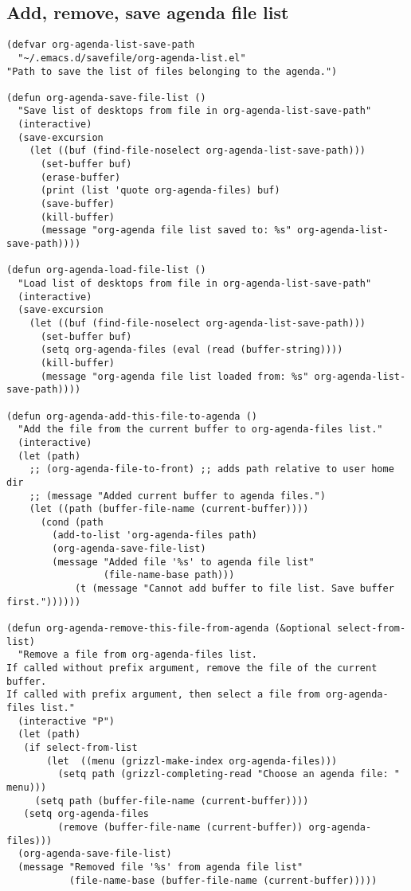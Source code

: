 \documentclass[10pt]{article}
\begin{document}
\subsection{Add, remove, save agenda file list}
\label{sec-8-2}

\begin{verbatim}
(defvar org-agenda-list-save-path
  "~/.emacs.d/savefile/org-agenda-list.el"
"Path to save the list of files belonging to the agenda.")

(defun org-agenda-save-file-list ()
  "Save list of desktops from file in org-agenda-list-save-path"
  (interactive)
  (save-excursion
    (let ((buf (find-file-noselect org-agenda-list-save-path)))
      (set-buffer buf)
      (erase-buffer)
      (print (list 'quote org-agenda-files) buf)
      (save-buffer)
      (kill-buffer)
      (message "org-agenda file list saved to: %s" org-agenda-list-save-path))))

(defun org-agenda-load-file-list ()
  "Load list of desktops from file in org-agenda-list-save-path"
  (interactive)
  (save-excursion
    (let ((buf (find-file-noselect org-agenda-list-save-path)))
      (set-buffer buf)
      (setq org-agenda-files (eval (read (buffer-string))))
      (kill-buffer)
      (message "org-agenda file list loaded from: %s" org-agenda-list-save-path))))

(defun org-agenda-add-this-file-to-agenda ()
  "Add the file from the current buffer to org-agenda-files list."
  (interactive)
  (let (path)
    ;; (org-agenda-file-to-front) ;; adds path relative to user home dir
    ;; (message "Added current buffer to agenda files.")
    (let ((path (buffer-file-name (current-buffer))))
      (cond (path
        (add-to-list 'org-agenda-files path)
        (org-agenda-save-file-list)
        (message "Added file '%s' to agenda file list"
                 (file-name-base path)))
            (t (message "Cannot add buffer to file list. Save buffer first."))))))

(defun org-agenda-remove-this-file-from-agenda (&optional select-from-list)
  "Remove a file from org-agenda-files list.
If called without prefix argument, remove the file of the current buffer.
If called with prefix argument, then select a file from org-agenda-files list."
  (interactive "P")
  (let (path)
   (if select-from-list
       (let  ((menu (grizzl-make-index org-agenda-files)))
         (setq path (grizzl-completing-read "Choose an agenda file: " menu)))
     (setq path (buffer-file-name (current-buffer))))
   (setq org-agenda-files
         (remove (buffer-file-name (current-buffer)) org-agenda-files)))
  (org-agenda-save-file-list)
  (message "Removed file '%s' from agenda file list"
           (file-name-base (buffer-file-name (current-buffer)))))


\end{verbatim}
\end{document}
